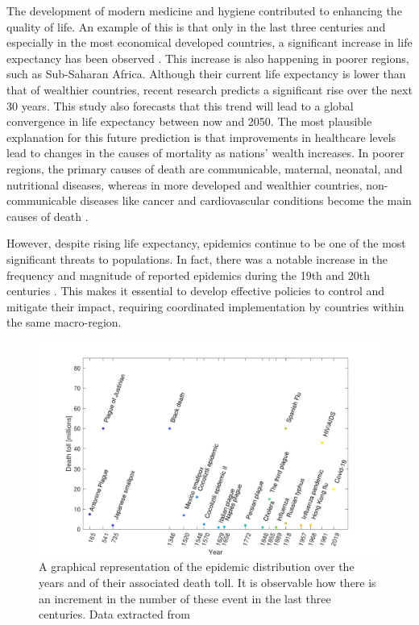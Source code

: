 The development of modern medicine and hygiene contributed to enhancing the quality of life. An example of this is that only in the last three centuries and especially in the most economical developed countries, a significant increase in life expectancy has been observed \cite{Anderson_82}.
This increase is also happening in poorer regions, such as Sub-Saharan Africa. Although their current life expectancy is lower than that of wealthier countries, recent research \cite{Vollset_2024} predicts a significant rise over the next 30 years. This study also forecasts that this trend will lead to a global convergence in life expectancy between now and 2050.
The most plausible explanation for this future prediction is that improvements in healthcare levels lead to changes in the causes of mortality as nations' wealth increases. In poorer regions, the primary causes of death are communicable, maternal, neonatal, and nutritional diseases, whereas in more developed and wealthier countries, non-communicable diseases like cancer and cardiovascular conditions become the main causes of death \cite{CITARE_DEVO_RITROVARE_LA_FONTE}.

However, despite rising life expectancy, epidemics continue to be one of the most significant threats to populations. In fact, there was a notable increase in the frequency and magnitude of reported epidemics during the 19th and 20th centuries \cite{Anderson_82}. This makes it essential to develop effective policies to control and mitigate their impact, requiring coordinated implementation by countries within the same macro-region.
\begin{figure}[h]
	\centering
	\includegraphics[width=0.85\linewidth]{0_introduction/images_introduction/worst_epidemic}
	\caption[Epidemic distribution in time]{A graphical representation of the epidemic distribution over the years and of their associated death toll. It is observable how there is an increment in the number of these event in the last three centuries. Data extracted from \cite{owid_historical_pandemics,wiki_pandemics}}
	\label{fig:worstepidemic}
\end{figure}

